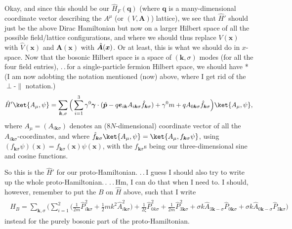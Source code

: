 \documentclass{report}
\begin{document}
Okay, and since this should be our $\hat H_F(\boldsymbol{q})$ (where $\boldsymbol{q}$ is a many-dimensional coordinate vector describing the $A^\mu$ (or $(V, \boldsymbol{A})$) lattice), we see that $\hat H'$ should just be the above Dirac Hamiltonian but now on a larger Hilbert space of all the possible field/lattice configurations, and where we should thus replace $V(\boldsymbol{x})$ with $\hat V(\boldsymbol{x})$ and $\boldsymbol A(\boldsymbol{x})$ with $\hat{\boldsymbol A\hspace{.3em}}\hspace{-.3em}(\boldsymbol{x})$. Or at least, this is what we should do in $x$-space. Now that the bosonic Hilbert space is a space of $(\boldsymbol{k},\sigma)$ modes (for all the four field entries), .\,.\,for a single-particle fermion Hilbert space, we should have *(I am now adobting the notation mentioned (now) above, where I get rid of the $\perp$-$\parallel$ notation.)
\begin{align}
\hat H' \ket{A_\mu, \psi} = 
	\sum_{\boldsymbol{k}, \sigma}\Big(
		\sum_{i=1}^{3} \gamma^0 \boldsymbol \gamma \cdot (
			\hat{\boldsymbol p\,}\! - 
				q \boldsymbol{e}_{i\boldsymbol{k}} 
				A_{i\boldsymbol{k}\sigma}
				\hat f_{\boldsymbol{k}\sigma}
		) +
		\gamma^0 m + q A_{0\boldsymbol{k}\sigma}
		\hat f_{\boldsymbol{k}\sigma}
	\Big) %
	\ket{A_\mu, \psi},
\end{align}
where $A_\mu = (A_{i\boldsymbol{k}\sigma})$ denotes an ($8N$-dimensional) coordinate vector of all the $A_{i\boldsymbol{k}\sigma}$-coordinates, and where 
$\hat f_{\boldsymbol{k}\sigma}\ket{A_\mu, \psi} = \ket{A_\mu, f_{\boldsymbol{k}\sigma} \psi}$, using $(f_{\boldsymbol{k}\sigma}\psi)(\boldsymbol{x}) = f_{\boldsymbol{k}\sigma}(\boldsymbol{x})\psi(\boldsymbol{x})$, with the $f_{\boldsymbol{k}\sigma}$s being our 
three-dimensional sine and cosine functions.

So this is the $\hat H'$ for our proto-Hamiltonian. .\,.\,I guess I should also try to write up the whole proto-Hamiltonian.\,. .\,.\,Hm, I can do that when I need to. I should, however, remember to put the $B$ on $\hat H$ above, such that I write 
\begin{align}
\begin{aligned}
	\hat H_B = \sum_{\boldsymbol k, \sigma}\bigg(
		\sum_{i=1}^2 \Big( 
			\frac{1}{2m} \hat P^2_{i \boldsymbol k \sigma} +
			\frac{1}{2} m k^2 \hat{A}_{i \boldsymbol k \sigma}^2
		\Big) +
	\frac{1}{2\xi} \hat P^2_{0 k \sigma} +
	\frac{1}{2m} \hat P^2_{3 \boldsymbol k \sigma} +
	\sigma k \hat{A}_{3 \boldsymbol k -\sigma} \hat P_{0 \boldsymbol k \sigma} + 
	\sigma k \hat{A}_{0 \boldsymbol k -\sigma} \hat P_{3 \boldsymbol k \sigma} \bigg)
\end{aligned} 
\end{align}
instead for the purely bosonic part of the proto-Hamiltonian.
\end{document}
